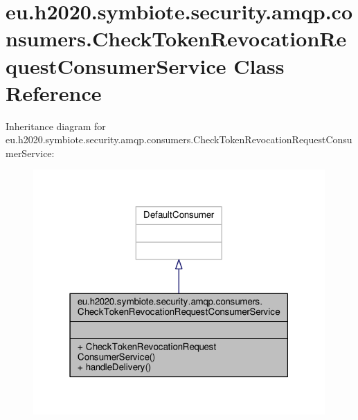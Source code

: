 \hypertarget{classeu_1_1h2020_1_1symbiote_1_1security_1_1amqp_1_1consumers_1_1CheckTokenRevocationRequestConsumerService}{}\section{eu.\+h2020.\+symbiote.\+security.\+amqp.\+consumers.\+Check\+Token\+Revocation\+Request\+Consumer\+Service Class Reference}
\label{classeu_1_1h2020_1_1symbiote_1_1security_1_1amqp_1_1consumers_1_1CheckTokenRevocationRequestConsumerService}


Inheritance diagram for eu.\+h2020.\+symbiote.\+security.\+amqp.\+consumers.\+Check\+Token\+Revocation\+Request\+Consumer\+Service\+:
\nopagebreak
\begin{figure}[H]
\begin{center}
\leavevmode
\includegraphics[width=316pt]{classeu_1_1h2020_1_1symbiote_1_1security_1_1amqp_1_1consumers_1_1CheckTokenRevocationRequestConsumerService__inherit__graph}
\end{center}
\end{figure}


